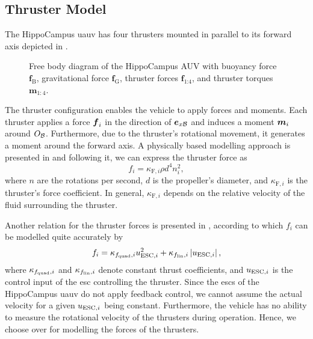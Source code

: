 \subsection{Thruster Model}
The HippoCampus \ac{uauv} has four thrusters mounted in parallel to its forward axis depicted in .
\begin{figure}[h!]
	\centering
	
	\caption{Free body diagram of the HippoCampus \mu AUV with buoyancy force $\bm{f}_\textrm{B}$, gravitational force $\bm{f}_\textrm{G}$, thruster forces $\bm{f}_\textrm{1:4}$, and thruster torques $\bm{m}_{1:4}$.}
	\label{fig:free-body-diagram}
\end{figure}
The thruster configuration enables the vehicle to apply forces and moments.
Each thruster applies a force $\mbox{$\bm{f}$}_{i}$ in the direction of $\mbox{$\bm{e}$}_{x\mathcal{B}}$ and induces a moment $\mbox{$\bm{m}$}_{i}$ around $O_{\mathcal{B}}$.
Furthermore, due to the thruster's rotational movement, it generates a moment around the forward axis. A physically based modelling approach is presented in \cite{Newman77} and following it, we can express the thruster force as
\begin{equation}
	\label{eq:thrust-function-newman}
	f_i = \kappa_{\text{F},i}\rho d^4 n_i^2
	,
\end{equation}
where $n$ are the rotations per second, $d$ is the propeller's diameter, and $\kappa_{\text{F},i}$ is the thruster's force coefficient. In general, $\kappa_{\text{F},i}$ depends on the relative velocity of the fluid surrounding the thruster.

Another relation for the thruster forces is presented in \cite{Hastedt19}, according to which $f_i$ can be modelled quite accurately by
\begin{equation}
	\label{eq:thrust-function-hastedt}
	f_i = \kappa_{f_{\text{quad}}, i} u_{\text{ESC},i}^2
	+ \kappa_{f_{\text{lin}}, i} \left\lvert u_{\text{ESC},i} \right\rvert
	,
\end{equation}
where $\kappa_{f_{\text{quad}}, i}$ and $\kappa_{f_{\text{lin}}, i}$ denote constant thrust coefficients, and $u_{\text{ESC},i}$ is the control input of the \ac{esc} controlling the thruster.
Since the \acp{esc} of the HippoCampus \ac{uauv} do not apply feedback control, we cannot assume the actual velocity for a given $u_{\text{ESC},i}$ being constant.
Furthermore, the vehicle has no ability to measure the rotational velocity of the thrusters during operation.
Hence, we choose  over  for modelling the forces of the thrusters.

